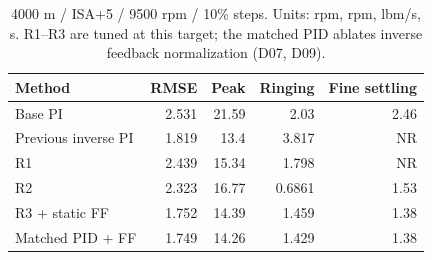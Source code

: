 \begin{table}[htbp]\centering\small\setlength{\tabcolsep}{4pt}\begin{tabular}{@{}lrrrr@{}}\toprule
Method & RMSE & Peak & Ringing & Fine settling\\\midrule
Base PI & 2.531 & 21.59 & 2.03 & 2.46\\
Previous inverse PI & 1.819 & 13.4 & 3.817 & NR\\
R1 & 2.439 & 15.34 & 1.798 & NR\\
R2 & 2.323 & 16.77 & 0.6861 & 1.53\\
R3 + static FF & 1.752 & 14.39 & 1.459 & 1.38\\
Matched PID + FF & 1.749 & 14.26 & 1.429 & 1.38\\
\bottomrule\end{tabular}\caption{4000 m / ISA+5 / 9500 rpm / 10\% steps. Units: rpm, rpm, lbm/s, s. R1--R3 are tuned at this target; the matched PID ablates inverse feedback normalization (D07, D09).}\label{tab:remedies}\end{table}